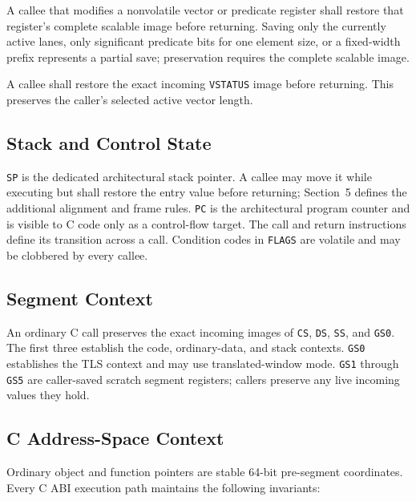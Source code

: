 \documentclass[10pt,twoside]{article}
\begin{document}
A callee that modifies a nonvolatile vector or predicate register shall
restore that register's complete scalable image before returning. Saving only
the currently active lanes, only significant predicate bits for one element
size, or a fixed-width prefix represents a partial save; preservation requires
the complete scalable image.

A callee shall restore the exact incoming \texttt{VSTATUS} image before
returning. This preserves the caller's selected active vector length.

\subsection{Stack and Control State}
\texttt{SP} is the dedicated architectural stack pointer. A
callee may move it while executing but shall restore the entry value before
returning; Section~5 defines the additional alignment and frame rules.
\texttt{PC} is the architectural program counter and is visible to C code
only as a control-flow target. The call and return instructions define its
transition across a call. Condition codes in
\texttt{FLAGS} are volatile and may be clobbered by every callee.

\subsection{Segment Context}
An ordinary C call preserves the exact incoming images of \texttt{CS},
\texttt{DS}, \texttt{SS}, and \texttt{GS0}. The first three establish the
code, ordinary-data, and stack contexts. \texttt{GS0} establishes the TLS
context and may use translated-window mode. \texttt{GS1} through \texttt{GS5}
are caller-saved scratch segment registers; callers preserve any live incoming
values they hold.

\subsection{C Address-Space Context}
Ordinary object and function pointers are stable 64-bit pre-segment
coordinates. Every C ABI execution path maintains the following invariants:
\end{document}
